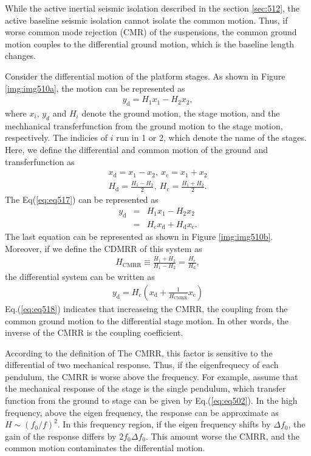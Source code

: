 While the active inertial seismic isolation described in the section \cref{sec:512}, the active baseline seismic isolation cannot isolate the common motion. Thus, if worse common mode rejection (CMR) of the suspensions, the common ground motion couples to the differential ground motion, which is the baseline length changes.


Consider the differential motion of the platform stages. As shown in Figure \ref{img:img510a}, the motion can be represented as 
\begin{eqnarray}
  y_{\mathrm{d}} = H_1x_1-H_2x_2 \label{eq:eq517},
\end{eqnarray}
where $x_{i},\,y_{d}$ and $H_{i}$ denote the ground motion, the stage motion, and the mechhanical transferfunction from the ground motion to the stage motion, respectively. The indicies of $i$ run in 1 or 2, which denote the name of the stages. Here, we define the differential and common motion of the ground and transferfunction as 
\begin{eqnarray} \label{eq:eq517_b}
  x_{\mathrm{d}} = {x_1-x_2},\ x_{\mathrm{c}} = {x_1+x_2}  \\
  H_{\mathrm{d}} = \frac{H_1-H_2}{2},\ H_{\mathrm{c}} = \frac{H_1+H_2}{2} \label{eq:eq517_a}.
\end{eqnarray}
The Eq(\ref{eq:eq517}) can be represented as 
\begin{eqnarray}
  y_{\mathrm{d}} &=& H_1x_1-H_2x_2 \\
  &=& H_{\mathrm{c}}x_{\mathrm{d}} + H_{\mathrm{d}}x_{\mathrm{c}}\label{eq:eq516}.
\end{eqnarray}
The last equation can be represented as shown in Figure \ref{img:img510b}. Moreover, if we define the CDMRR of this system as
\begin{eqnarray}
  H_{\mathrm{CMRR}} \equiv \frac{H_1+H_2}{H_1-H_2}=\frac{H_{\mathrm{c}}}{H_{\mathrm{d}}} \label{eq:eq519},
\end{eqnarray}
the differential system can be written as 
\begin{eqnarray}
  y_{\mathrm{d}} = H_{\mathrm{c}}\left( x_{\mathrm{d}} + \frac{1}{H_{\mathrm{CMRR}}}x_{\mathrm{c}}\right) \label{eq:eq518}
\end{eqnarray}
Eq.(\ref{eq:eq518}) indicates that increaseing the CMRR, the coupling from the common ground motion to the differential stage motion. In other words, the inverse of the CMRR is the coupling coefficient.

According to the definition of The CMRR, this factor is sensitive to the differential of two mechanical response. Thus, if the eigenfrequecy of each pendulum, the CMRR is worse above the frequency. For example, assume that the mechanical response of the stage is the single pendulum, which transfer function from the ground to stage can be given by Eq.(\ref{eq:eq502}). In the high frequency, above the eigen frequency, the response can be approximate as $H\sim{({f_0}/{f})^2}$. In this frequency region, if the eigen frequency shifts by $\Delta{f_0}$, the gain of the response differs by $2f_0\Delta{f_0}$. This amount worse the CMRR, and the common motion contaminates the differential motion.


